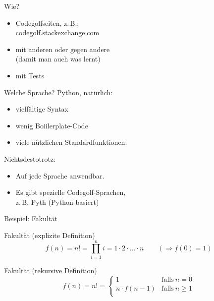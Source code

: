 \documentclass[xcolor=dvipsnames, aspectratio=43, 14pt]{beamer}
\begin{document}
\begin{frame}{Wie?}
	\begin{itemize}
		\item Codegolfseiten, z.\,B.:\\
			codegolf.stackexchange.com
		\item mit anderen oder gegen andere\\
			(damit man auch was lernt)
		\item mit Tests
	\end{itemize}
\end{frame}

\begin{frame}{Welche Sprache?}
	Python, natürlich:
	\begin{itemize}
		\item vielfältige Syntax
		\item wenig Boiilerplate-Code
		\item viele nützlichen Standardfunktionen.
	\end{itemize}
	
	\vfill
	
	Nichtsdestotrotz:
	\begin{itemize}
		\item Auf jede Sprache anwendbar.
		\item Es gibt spezielle Codegolf-Sprachen,\\
			z. B. Pyth (Python-basiert)
	\end{itemize}
\end{frame}


\begin{frame}{Beispiel: Fakultät}
	\begin{block}{Fakultät (explizite Definition)}
	\[f(n) = n! = \prod_{i=1}^n i = 1·2·…·n \qquad (⇒f(0)=1)\]
	\end{block}
	
	\pause
	
	\begin{block}{Fakultät (rekursive Definition)}
	\[f(n) = n! = \begin{cases}
			1 & \mathrm{falls~} n=0\\
			n·f(n-1) & \mathrm{falls~} n \geq 1\\
	         \end{cases}\]
	\end{block}
\end{frame}
\end{document}
